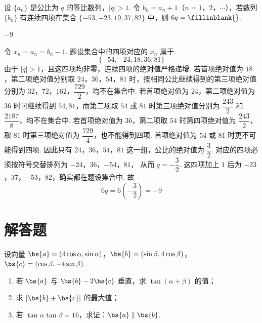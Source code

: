 \begin{problem}
设 \(\{a_n\}\) 是公比为 \(q\) 的等比数列，\(|q|>1\). 令 \(b_n=a_n+1\)（\(n=1\)，\(2\)，\(\cdots\)），若数列 \(\{b_n\}\) 有连续四项在集合 \(\{-53,-23,19,37,82\}\) 中，则 \(6q=\fillinblank{}\).
\end{problem}

\begin{answer}
\(-9\)
\end{answer}

\begin{solution}
令 \(x_n=a_n=b_n-1\). 题设集合中的四项对应的 \(x_n\) 属于
\[
\{-54,-24,18,36,81\}
\]
由于 \(|q|>1\)，且这四项均非零，连续四项的绝对值严格递增. 若首项绝对值为 \(18\)，第二项绝对值分别取 \(24\)，\(36\)，\(54\)，\(81\) 时，按相同公比继续得到的第三项绝对值分别为 \(32\)，\(72\)，\(162\)，\(\dfrac{729}{2}\)，均不在集合中. 若首项绝对值为 \(24\)，第二项绝对值为 \(36\) 时可继续得到 \(54,81\)，而第二项取 \(54\) 或 \(81\) 时第三项绝对值分别为 \(\dfrac{243}{2}\) 和 \(\dfrac{2187}{8}\)，均不在集合中. 若首项绝对值为 \(36\)，第二项取 \(54\) 时第四项绝对值为 \(\dfrac{243}{2}\)，取 \(81\) 时第三项绝对值为 \(\dfrac{729}{4}\)，也不能得到四项. 首项绝对值为 \(54\) 或 \(81\) 时更不可能得到四项. 因此只有
\(24\)，\(36\)，\(54\)，\(81\)
这一组，公比的绝对值为 \(\dfrac32\). 对应的四项必须按符号交替排列为
\(-24\)，\(36\)，\(-54\)，\(81\)，
从而 \(q=-\dfrac32\). 这四项加上 \(1\) 后为 \(-23\)，\(37\)，\(-53\)，\(82\)，确实都在题设集合中. 故
\[
6q=6\left(-\frac32\right)=-9
\]
\end{solution}

\section{解答题}

\begin{problem}
设向量 \(\bs{a}=(4\cos\alpha,\sin\alpha)\)，\(\bs{b}=(\sin\beta,4\cos\beta)\)，\(\bs{c}=(\cos\beta,-4\sin\beta)\).

\begin{enumerate}
\item 若 \(\bs{a}\) 与 \(\bs{b}-2\bs{c}\) 垂直，求 \(\tan(\alpha+\beta)\) 的值；
\item 求 \(|\bs{b}+\bs{c}|\) 的最大值；
\item 若 \(\tan\alpha\tan\beta=16\)，求证：\(\bs{a}\parallel\bs{b}\).
\end{enumerate}
\end{problem}

